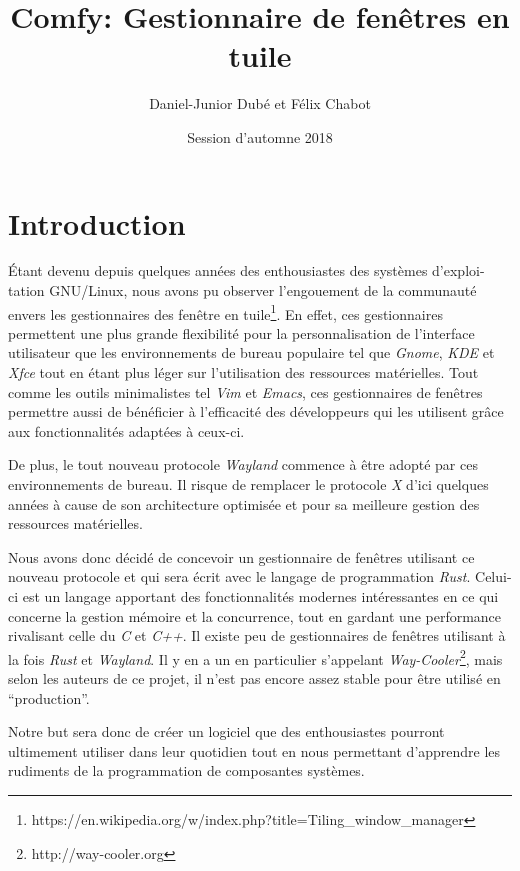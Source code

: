 \documentclass[titlepage]{article}
\title{Comfy: Gestionnaire de fenêtres en tuile}
\author{Daniel-Junior Dubé et Félix Chabot}
\date{Session d'automne 2018}
\begin{document}
\maketitle

\renewcommand{\contentsname}{Table des matières}
\tableofcontents
\newpage

\section{Introduction}
\par
\bigskip
Étant devenu depuis quelques années des enthousiastes des systèmes
d'exploi-tation GNU/Linux, nous avons pu observer l’engouement de la communauté
envers les gestionnaires des fenêtre en
tuile\footnote{https://en.wikipedia.org/w/index.php?title=Tiling\_window\_manager}.
En effet, ces gestionnaires permettent une plus grande flexibilité pour la
personnalisation de l’interface utilisateur que les environnements de bureau
populaire tel que \textit{Gnome}, \textit{KDE} et \textit{Xfce} tout en étant
plus léger sur l’utilisation des ressources matérielles. Tout comme les outils
minimalistes tel \textit{Vim} et \textit{Emacs}, ces gestionnaires de fenêtres
permettre aussi de bénéficier à l’efficacité des développeurs qui les utilisent
grâce aux fonctionnalités adaptées à ceux-ci.

\par
\bigskip
De plus, le tout nouveau protocole \textit{Wayland} commence à être adopté par
ces environnements de bureau. Il risque de remplacer le protocole \textit{X}
d'ici quelques années à cause de son architecture optimisée et pour sa
meilleure gestion des ressources matérielles.

\par
\bigskip
Nous avons donc décidé de concevoir un gestionnaire de fenêtres utilisant ce
nouveau protocole et qui sera écrit avec le langage de programmation
\textit{Rust}. Celui-ci est un langage apportant des fonctionnalités modernes
intéressantes en ce qui concerne la gestion mémoire et la concurrence, tout en
gardant une performance rivalisant celle du \textit{C} et \textit{C++}.  Il
existe peu de gestionnaires de fenêtres utilisant à la fois \textit{Rust} et
\textit{Wayland}. Il y en a un en particulier s’appelant
\textit{Way-Cooler}\footnote{http://way-cooler.org}, mais selon les auteurs de
ce projet, il n’est pas encore assez stable pour être utilisé en “production”.

\par
\bigskip
Notre but sera donc de créer un logiciel que des enthousiastes pourront
ultimement utiliser dans leur quotidien tout en nous permettant d’apprendre les
rudiments de la programmation de composantes systèmes.
\end{document}
